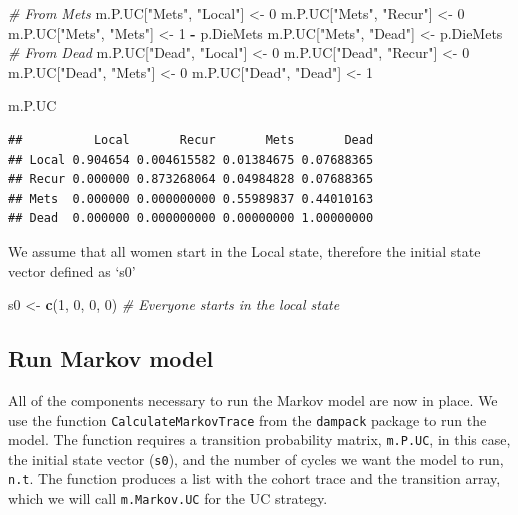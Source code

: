 \documentclass[]{article}
\newenvironment{Shaded}{\begin{snugshade}}{\end{snugshade}}
\newcommand{\KeywordTok}[1]{\textcolor[rgb]{0.13,0.29,0.53}{\textbf{#1}}}
\newcommand{\DecValTok}[1]{\textcolor[rgb]{0.00,0.00,0.81}{#1}}
\newcommand{\StringTok}[1]{\textcolor[rgb]{0.31,0.60,0.02}{#1}}
\newcommand{\CommentTok}[1]{\textcolor[rgb]{0.56,0.35,0.01}{\textit{#1}}}
\newcommand{\OperatorTok}[1]{\textcolor[rgb]{0.81,0.36,0.00}{\textbf{#1}}}
\newcommand{\NormalTok}[1]{#1}
\theoremstyle{definition}
\theoremstyle{definition}
\theoremstyle{definition}
\theoremstyle{remark}
\begin{document}
\begin{Shaded}
\begin{Highlighting}[]
\CommentTok{# From Mets}
\NormalTok{m.P.UC[}\StringTok{"Mets"}\NormalTok{, }\StringTok{"Local"}\NormalTok{]  <-}\StringTok{ }\DecValTok{0}
\NormalTok{m.P.UC[}\StringTok{"Mets"}\NormalTok{, }\StringTok{"Recur"}\NormalTok{]  <-}\StringTok{ }\DecValTok{0}
\NormalTok{m.P.UC[}\StringTok{"Mets"}\NormalTok{, }\StringTok{"Mets"}\NormalTok{]   <-}\StringTok{ }\DecValTok{1} \OperatorTok{-}\StringTok{ }\NormalTok{p.DieMets}
\NormalTok{m.P.UC[}\StringTok{"Mets"}\NormalTok{, }\StringTok{"Dead"}\NormalTok{]   <-}\StringTok{ }\NormalTok{p.DieMets}
\CommentTok{# From Dead}
\NormalTok{m.P.UC[}\StringTok{"Dead"}\NormalTok{, }\StringTok{"Local"}\NormalTok{]  <-}\StringTok{ }\DecValTok{0}
\NormalTok{m.P.UC[}\StringTok{"Dead"}\NormalTok{, }\StringTok{"Recur"}\NormalTok{]  <-}\StringTok{ }\DecValTok{0}
\NormalTok{m.P.UC[}\StringTok{"Dead"}\NormalTok{, }\StringTok{"Mets"}\NormalTok{]   <-}\StringTok{ }\DecValTok{0}
\NormalTok{m.P.UC[}\StringTok{"Dead"}\NormalTok{, }\StringTok{"Dead"}\NormalTok{]   <-}\StringTok{ }\DecValTok{1}

\NormalTok{m.P.UC}
\end{Highlighting}
\end{Shaded}

\begin{verbatim}
##          Local       Recur       Mets       Dead
## Local 0.904654 0.004615582 0.01384675 0.07688365
## Recur 0.000000 0.873268064 0.04984828 0.07688365
## Mets  0.000000 0.000000000 0.55989837 0.44010163
## Dead  0.000000 0.000000000 0.00000000 1.00000000
\end{verbatim}

We assume that all women start in the Local state, therefore the initial
state vector defined as `s0'

\begin{Shaded}
\begin{Highlighting}[]
\NormalTok{s0 <-}\StringTok{ }\KeywordTok{c}\NormalTok{(}\DecValTok{1}\NormalTok{, }\DecValTok{0}\NormalTok{, }\DecValTok{0}\NormalTok{, }\DecValTok{0}\NormalTok{) }\CommentTok{# Everyone starts in the local state}
\end{Highlighting}
\end{Shaded}

\subsection{Run Markov model}\label{run-markov-model}

All of the components necessary to run the Markov model are now in
place. We use the function \texttt{CalculateMarkovTrace} from the
\texttt{dampack} package to run the model. The function requires a
transition probability matrix, \texttt{m.P.UC}, in this case, the
initial state vector (\texttt{s0}), and the number of cycles we want the
model to run, \texttt{n.t}. The function produces a list with the cohort
trace and the transition array, which we will call \texttt{m.Markov.UC}
for the UC strategy.
\end{document}
